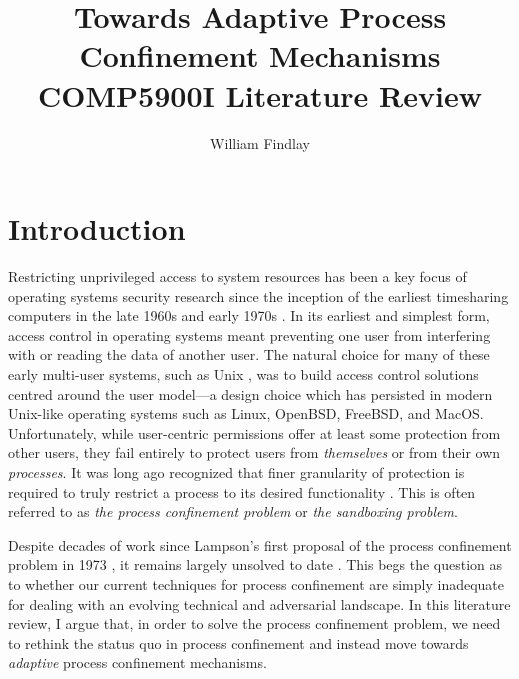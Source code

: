 \documentclass[dvipsnames, 12pt]{article}
\title{\huge Towards Adaptive Process Confinement
Mechanisms\\{\large COMP5900I Literature Review}}
\author{William Findlay}
\begin{document}
\maketitle
\thispagestyle{empty}


\vfill
\begin{abstract}
\end{abstract}
\vfill
\vfill

\clearpage

\setcounter{page}{1}

\onehalfspacing

\section{Introduction}
\label{sec:introduction}

Restricting unprivileged access to system resources has been a key focus of
operating systems security research since the inception of the earliest
timesharing computers in the late 1960s and early 1970s
\cite{graham1968_protection, ritchie1973_unix, corbato1962_ctss}. In its
earliest and simplest form, access control in operating systems meant preventing
one user from interfering with or reading the data of another user. The natural
choice for many of these early multi-user systems, such as Unix
\cite{ritchie1973_unix}, was to build access control solutions centred around
the user model---a design choice which has persisted in modern Unix-like
operating systems such as Linux, OpenBSD, FreeBSD, and MacOS.  Unfortunately,
while user-centric permissions offer at least some protection from other users,
they fail entirely to protect users from \textit{themselves} or from their own
\textit{processes}.  It was long ago recognized that finer granularity of
protection is required to truly restrict a process to its desired functionality
\cite{lampson1973_a_note}. This is often referred to as \textit{the process
confinement problem} or \textit{the sandboxing problem}.

Despite decades of work since Lampson's first proposal of the process
confinement problem in 1973 \cite{lampson1973_a_note}, it remains largely
unsolved to date \cite{crowell2013_confinement_problem}. This begs the question
as to whether our current techniques for process confinement are simply
inadequate for dealing with an evolving technical and adversarial landscape.  In
this literature review, I argue that, in order to solve the process confinement
problem, we need to rethink the status quo in process confinement and instead
move towards \textit{adaptive} process confinement mechanisms.
\end{document}
